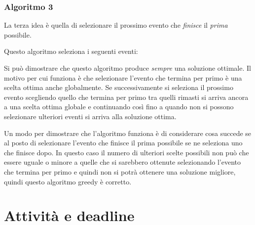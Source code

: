 \subsubsection*{Algoritmo 3}

La terza idea è quella di selezionare il prossimo 
evento che \emph{finisce} il \emph{prima} possibile.

Questo algoritmo seleziona i seguenti eventi:
\begin{center}
\end{center}

Si può dimostrare che questo algoritmo produce
\emph{sempre} una soluzione ottimale.
Il motivo per cui funziona è che selezionare l'evento 
che termina per primo è una scelta ottima anche
globalmente.
Se successivamente si seleziona il prossimo evento
scegliendo quello che termina per primo tra quelli rimasti
si arriva ancora a una scelta ottima globale e continuando 
così fino a quando non si possono selezionare ulteriori eventi
si arriva alla soluzione ottima.

Un modo per dimostrare che l'algoritmo funziona
è di considerare cosa succede se al posto di selezionare
l'evento che finisce il prima possibile se 
ne seleziona uno che finisce dopo.
In questo caso il numero di ulteriori scelte possibili
non può che essere uguale o minore a quelle che si sarebbero
ottenute selezionando l'evento che termina per primo
e quindi non si potrà ottenere una soluzione migliore,
quindi questo algoritmo greedy è corretto.

\section{Attività e deadline}

